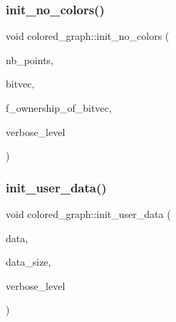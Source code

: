 \mbox{\label{classcolored__graph_a031519ee30b86a4077a5bcdc42ee2f18}} 
\subsubsection{\texorpdfstring{init\+\_\+no\+\_\+colors()}{init\_no\_colors()}}
{\footnotesize\ttfamily void colored\+\_\+graph\+::init\+\_\+no\+\_\+colors (\begin{DoxyParamCaption}\item[{\mbox{\hyperlink{galois_8h_a09fddde158a3a20bd2dcadb609de11dc}{I\+NT}}}]{nb\+\_\+points,  }\item[{\mbox{\hyperlink{galois_8h_a122c4acf389c050379f00341fdcd5812}{U\+B\+Y\+TE}} $\ast$}]{bitvec,  }\item[{\mbox{\hyperlink{galois_8h_a09fddde158a3a20bd2dcadb609de11dc}{I\+NT}}}]{f\+\_\+ownership\+\_\+of\+\_\+bitvec,  }\item[{\mbox{\hyperlink{galois_8h_a09fddde158a3a20bd2dcadb609de11dc}{I\+NT}}}]{verbose\+\_\+level }\end{DoxyParamCaption})}

\mbox{\label{classcolored__graph_a9b5e52110265b750e709d8b84ba03d8f}} 
\subsubsection{\texorpdfstring{init\+\_\+user\+\_\+data()}{init\_user\_data()}}
{\footnotesize\ttfamily void colored\+\_\+graph\+::init\+\_\+user\+\_\+data (\begin{DoxyParamCaption}\item[{\mbox{\hyperlink{galois_8h_a09fddde158a3a20bd2dcadb609de11dc}{I\+NT}} $\ast$}]{data,  }\item[{\mbox{\hyperlink{galois_8h_a09fddde158a3a20bd2dcadb609de11dc}{I\+NT}}}]{data\+\_\+size,  }\item[{\mbox{\hyperlink{galois_8h_a09fddde158a3a20bd2dcadb609de11dc}{I\+NT}}}]{verbose\+\_\+level }\end{DoxyParamCaption})}

